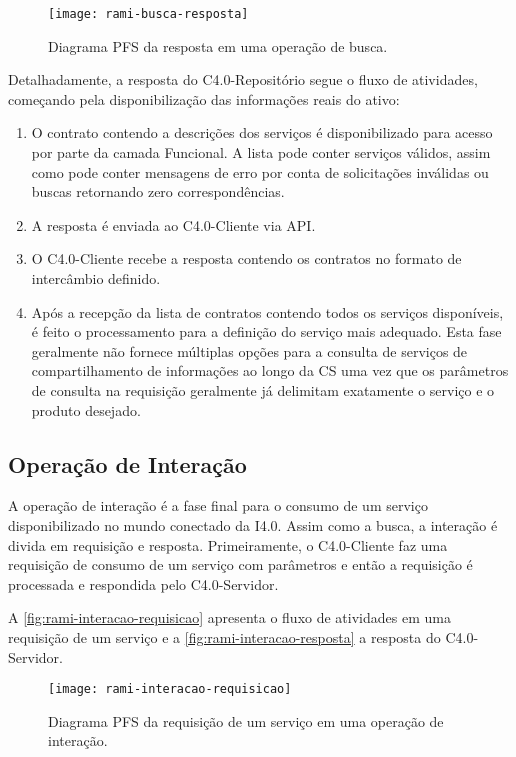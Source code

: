 \begin{figure}[htb]
	\centering
	\texttt{[image: rami-busca-resposta]}
	\caption{Diagrama PFS da resposta em uma operação de busca.}
	\label{fig:rami-busca-resposta}
\end{figure}

Detalhadamente, a resposta do C4.0-Repositório segue o fluxo de atividades, começando pela disponibilização das informações reais do ativo:

\begin{enumerate}
	\item O contrato contendo a descrições dos serviços é disponibilizado para acesso por parte da camada Funcional. A lista  pode conter serviços válidos, assim como pode conter mensagens de erro por conta de solicitações inválidas ou buscas retornando zero correspondências.

	\item A resposta é enviada ao C4.0-Cliente via API.

	\item O C4.0-Cliente recebe a resposta contendo os contratos no formato de intercâmbio definido.

	\item Após a recepção da lista de contratos contendo todos os serviços disponíveis, é feito o processamento para a definição do serviço mais adequado. Esta fase geralmente não fornece múltiplas opções para a consulta de serviços de compartilhamento de informações ao longo da CS uma vez que os parâmetros de consulta na requisição geralmente já delimitam exatamente o serviço e o produto desejado.
\end{enumerate}

\subsection{Operação de Interação}

A operação de interação é a fase final para o consumo de um serviço disponibilizado no mundo conectado da I4.0. Assim como a busca, a interação é divida em requisição e resposta. Primeiramente, o C4.0-Cliente faz uma requisição de consumo de um serviço com parâmetros e então a requisição é processada e respondida pelo C4.0-Servidor.

A \autoref{fig:rami-interacao-requisicao} apresenta o fluxo de atividades em uma requisição de um serviço e a \autoref{fig:rami-interacao-resposta} a resposta do C4.0-Servidor.

\begin{figure}[htb]
	\centering
	\texttt{[image: rami-interacao-requisicao]}
	\caption{Diagrama PFS da requisição de um serviço em uma operação de interação.}
	\label{fig:rami-interacao-requisicao}
\end{figure}

